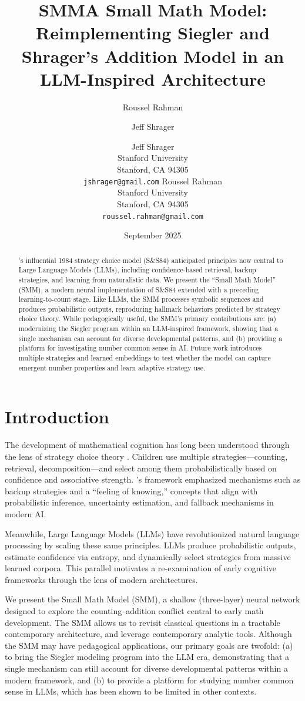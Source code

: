 \documentclass{article}
\title{SMM}
\author{Roussel Rahman}
\author{Jeff Shrager}
\date{September 2025}
\title{A Small Math Model: Reimplementing Siegler and Shrager's Addition Model in an LLM-Inspired Architecture}
\author{
  Jeff Shrager\\
  Stanford University\\
  Stanford, CA 94305\\
  \texttt{jshrager@gmail.com}
  \And
  Roussel Rahman\\
  Stanford University\\
  Stanford, CA 94305\\
  \texttt{roussel.rahman@gmail.com}
}
\begin{document}
\maketitle

\begin{abstract}
\citeauthor{siegler1984strategychoices}'s influential 1984 strategy choice model (S\&S84) anticipated principles now central to Large Language Models (LLMs), including confidence-based retrieval, backup strategies, and learning from naturalistic data. We present the ``Small Math Model'' (SMM), a modern neural implementation of S\&S84 extended with a preceding learning-to-count stage. Like LLMs, the SMM processes symbolic sequences and produces probabilistic outputs, reproducing hallmark behaviors predicted by strategy choice theory. While pedagogically useful, the SMM’s primary contributions are: (a) modernizing the Siegler program within an LLM-inspired framework, showing that a single mechanism can account for diverse developmental patterns, and (b) providing a platform for investigating number common sense in AI. Future work introduces multiple strategies and learned embeddings to test whether the model can capture emergent number properties and learn adaptive strategy use.
\end{abstract}


\section{Introduction}
The development of mathematical cognition has long been understood through the lens of strategy choice theory \citep{siegler1984strategychoices, siegler1987perils, siegler1991microgenetic, shrager1998scads}. Children use multiple strategies---counting, retrieval, decomposition---and select among them probabilistically based on confidence and associative strength. \citeauthor{siegler1984strategychoices}'s framework emphasized mechanisms such as backup strategies and a ``feeling of knowing,'' concepts that align with probabilistic inference, uncertainty estimation, and fallback mechanisms in modern AI.

Meanwhile, Large Language Models (LLMs) have revolutionized natural language processing by scaling these same principles. LLMs produce probabilistic outputs, estimate confidence via entropy, and dynamically select strategies from massive learned corpora. This parallel motivates a re-examination of early cognitive frameworks through the lens of modern architectures.

We present the Small Math Model (SMM), a shallow (three-layer) neural network designed to explore the counting–addition conflict central to early math development. The SMM allows us to revisit classical questions in a tractable contemporary architecture, and leverage contemporary analytic tools. Although the SMM may have pedagogical applications, our primary goals are twofold: (a) to bring the Siegler modeling program into the LLM era, demonstrating that a single mechanism can still account for diverse developmental patterns within a modern framework, and (b) to provide a platform for studying number common sense in LLMs, which has been shown to be limited in other contexts. 
\end{document}
